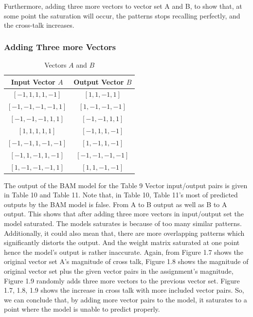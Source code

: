 \documentclass[12pt]{article}
\begin{document}
Furthermore, adding three more vectors to vector set A and B, to show that, at some point the saturation will occur, the patterns stops recalling perfectly, and the cross-talk increases.

\break

\subsubsection{Adding Three more Vectors}

\begin{table}[ht]
    \begin{center}
        \caption{Vectors \( A \) and \( B \)}
        \begin{tabular}{|c|c|}
            \hline
            \textbf{Input Vector \( A \)} & \textbf{Output Vector \( B \)} \\ \hline
            $[-1, 1, 1, 1, -1]$ & $[1, 1, -1, 1]$ \\ \hline
            $[-1, -1, -1, -1, 1]$ & $[1, -1, -1, -1]$ \\ \hline
            $[-1, -1, -1, 1, 1]$ & $[-1, -1, 1, 1]$ \\ \hline
            $[1, 1, 1, 1, 1]$ & $[-1, 1, 1, -1]$ \\ \hline
            $[-1, -1, 1, -1, -1]$ & $[1, -1, 1, -1]$ \\ \hline
            $[-1, 1, -1, 1, -1]$ & $[-1, -1, -1, -1]$ \\ \hline
            $[1, -1, -1, -1, 1]$ & $[1, 1, -1, -1]$ \\ \hline
        \end{tabular}
    \end{center}
    
\end{table}

The output of the BAM model for the Table 9 Vector input/output pairs is given in Table 10 and Table 11.
Note that, in Table 10, Table 11's most of predicted outputs by the BAM model is false. From A to B output as well as B to A output. This shows that after adding three more vectors in input/output set the model saturated. The models saturates is because of too many similar patterns. Additionally, it could also mean that, there are more overlapping patterns which significantly distorts the output. And the weight matrix saturated at one point hence the model's output is rather inaccurate. Again, from Figure 1.7 shows the original vector set A's magnitude of cross talk, Figure 1.8 shows the magnitude of original vector set plus the given vector pairs in the assignment's magnitude, Figure 1.9 randomly adds three more vectors to the previous vector set. Figure 1.7, 1.8, 1.9 shows the increase in cross talk with more included vector pairs. So, we can conclude that, by adding more vector pairs to the model, it saturates to a point where the model is unable to predict properly. 
\end{document}
